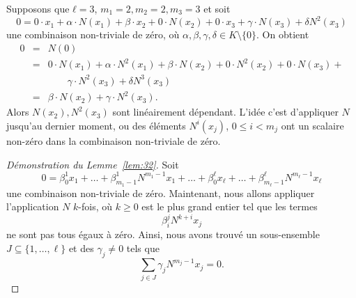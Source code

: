 \begin{example}
  \label{sec:les-endom-nilp-2}
  Supposons que $ℓ = 3$, $m_1=2, m_2=2, m_3=3$ et soit
  \begin{displaymath}
     0 = 0 ⋅ x_1 + α ⋅ N(x_1) + β ⋅x_2 + 0 ⋅N(x_2) + 0 ⋅ x_3 + γ ⋅ N(x_3) + δ N^2(x_3) 
   \end{displaymath}
   une combinaison non-triviale de zéro, où $α,β,γ,δ ∈ K \setminus \{0\}$. On obtient
   \begin{eqnarray*}
     0 &  =&  N(0) \\
       &  =& 0 ⋅ N(x_1) + α ⋅ N^2(x_1) + β ⋅N(x_2) + 0 ⋅N^2(x_2) + 0 ⋅ N(x_3) +  \\
     & &  \quad \quad γ ⋅ N^2(x_3) + δ N^3(x_3)  \\
     & = & β ⋅N(x_2) + γ ⋅ N^2(x_3).
   \end{eqnarray*}
   Alors $N(x_2),  N^2(x_3)$ sont linéairement dépendant. L'idée c'est d'appliquer $N$ jusqu'au dernier moment, ou des éléments $N^i(x_j)$, $0 ≤ i < m_j$ ont un scalaire non-zéro dans la combinaison non-triviale de zéro. 
 \end{example}
 
\begin{proof}[Démonstration du Lemme~\ref{lem:32}] 
  Soit \begin{displaymath}
    0 =   β_0^1 x_1 + %
    \dots+ β_{m_1-1}^1 N^{m_1-1}x_1 + \dots + 
    β_0^\ell x_\ell + %
    \dots+ β_{m_\ell-1}^\ell N^{m_\ell-1}x_\ell 
\end{displaymath}
une combinaison non-triviale de zéro.
Maintenant, nous allons appliquer l'application $N$ $k$-fois, où $k \geq 0$ est le plus grand entier tel que les termes 
\begin{displaymath}
  β_i^j N^{k+i}x_j 
\end{displaymath}
ne sont pas tous égaux à zéro. Ainsi, nous avons trouvé un sous-ensemble $J ⊆ \{1,\dots,\ell \}$ et des $γ_j ≠ 0$ tels que 
\begin{displaymath}
  \sum_{j \in J} γ_j N^{m_j-1}x_j = 0.
\end{displaymath}
\end{proof}

